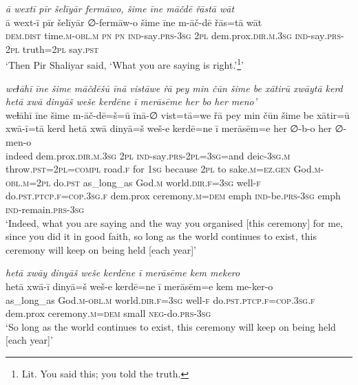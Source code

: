 \ea \label{ZP.126}
\textit{ā wextī pīr šelīyār fermāwo, šime īne māčdē řāstā wāt} \\ 
\gll ā wext-ī pīr šelīyār ∅-fermāw-o šime īne m-āč-dē řās=tā wāt \\ 
 \textsc{dem.dist} time\textsc{.m}\textsc{-obl}\textsc{.m} \textsc{pn} \textsc{pn} \textsc{ind-}say\textsc{.prs}\textsc{-3sg} \textsc{2pl} dem.prox\textsc{.dir}\textsc{.m}\textsc{.3sg} \textsc{ind-}say\textsc{.prs}-\textsc{2pl} truth=\textsc{2pl} say\textsc{.pst} \\ 
\glt `Then Pir Shaliyar said, ‘What you are saying is right.’\footnote{Lit. You said this; you told the truth.}'
\z 
 
\ea \label{ZP.128}
\textit{weɫāhī īne šime māčdēšū īnā vistāwe řā pey min čūn šime be xātirū xwāytā kerd hetā xwā dinyāš weše kerdēne ī merāsēme her bo her meno’} \\ 
\gll weɫāhī īne šime m-āč-dē=š=ū īnā-∅ vist=tā=we řā pey min čūn šime be xātir=ū xwā-ī=tā kerd hetā xwā dinyā=š weš-e kerdē=ne ī merāsēm=e her ∅-b-o her ∅-men-o \\ 
 indeed dem.prox\textsc{.dir}\textsc{.m}\textsc{.3sg} \textsc{2pl} \textsc{ind-}say\textsc{.prs}-\textsc{2pl}\textsc{=3sg}=and deic\textsc{-3sg}\textsc{.m} throw\textsc{.pst}=\textsc{2pl}\textsc{=compl} road\textsc{.f} for \textsc{1sg} because \textsc{2pl} to sake\textsc{.m}\textsc{\textsc{=ez.gen}} God\textsc{.m}\textsc{-obl}\textsc{.m}=\textsc{2pl} do\textsc{.pst} as\_long\_as God\textsc{.m} world\textsc{.dir}\textsc{.f}\textsc{=3sg} well\textsc{-f} do\textsc{.pst}\textsc{.ptcp}\textsc{.f}\textsc{=cop}\textsc{.3sg}\textsc{.f} dem.prox ceremony\textsc{.m}\textsc{=dem} emph \textsc{ind-}be\textsc{.prs}\textsc{-3sg} emph \textsc{ind-}remain\textsc{.prs}\textsc{-3sg} \\ 
\glt `Indeed, what you are saying and the way you organised [this ceremony] for me, since you did it in good faith, so long as the world continues to exist, this ceremony will keep on being held [each year]'
\z 
 
\ea \label{ZP.130}
\textit{hetā xwāy dinyāš weše kerdēne ī merāsēme kem mekero} \\ 
\gll hetā xwā-ī dinyā=š weš-e kerdē=ne ī merāsēm=e kem me-ker-o \\ 
 as\_long\_as God\textsc{.m}\textsc{-obl}\textsc{.m} world\textsc{.dir}\textsc{.f}\textsc{=3sg} well\textsc{-f} do\textsc{.pst}\textsc{.ptcp}\textsc{.f}\textsc{=cop}\textsc{.3sg}\textsc{.f} dem.prox ceremony\textsc{.m}\textsc{=dem} small \textsc{neg-}do\textsc{.prs}\textsc{-3sg} \\ 
\glt `So long as the world continues to exist, this ceremony will keep on being held [each year]'
\z 
 

